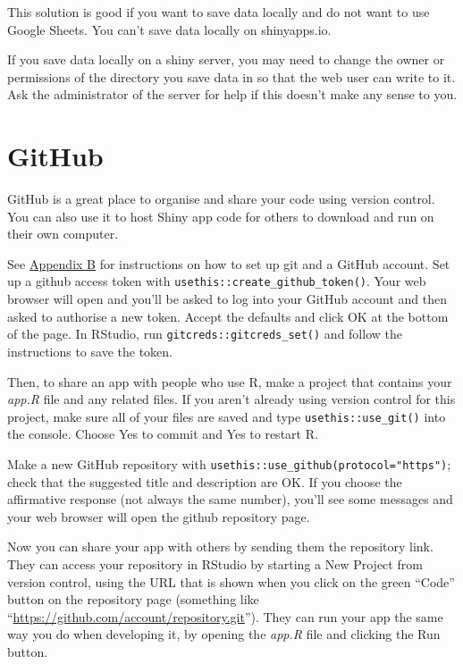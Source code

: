 \documentclass[
]{book}
\begin{document}
This solution is good if you want to save data locally and do not want to use Google Sheets. You can't save data locally on shinyapps.io.

If you save data locally on a shiny server, you may need to change the owner or permissions of the directory you save data in so that the web user can write to it. Ask the administrator of the server for help if this doesn't make any sense to you.

\hypertarget{github}{%
\section{GitHub}\label{github}}

GitHub is a great place to organise and share your code using version control. You can also use it to host Shiny app code for others to download and run on their own computer.

See \protect\hyperlink{setup-git}{Appendix B} for instructions on how to set up git and a GitHub account. Set up a github access token with \texttt{usethis::create\_github\_token()}. Your web browser will open and you'll be asked to log into your GitHub account and then asked to authorise a new token. Accept the defaults and click OK at the bottom of the page. In RStudio, run \texttt{gitcreds::gitcreds\_set()} and follow the instructions to save the token.

Then, to share an app with people who use R, make a project that contains your \emph{app.R} file and any related files. If you aren't already using version control for this project, make sure all of your files are saved and type \texttt{usethis::use\_git()} into the console. Choose Yes to commit and Yes to restart R.

Make a new GitHub repository with \texttt{usethis::use\_github(protocol="https")}; check that the suggested title and description are OK. If you choose the affirmative response (not always the same number), you'll see some messages and your web browser will open the github repository page.

Now you can share your app with others by sending them the repository link. They can access your repository in RStudio by starting a New Project from version control, using the URL that is shown when you click on the green ``Code'' button on the repository page (something like ``\url{https://github.com/account/repository.git}''). They can run your app the same way you do when developing it, by opening the \emph{app.R} file and clicking the Run button.
\end{document}
